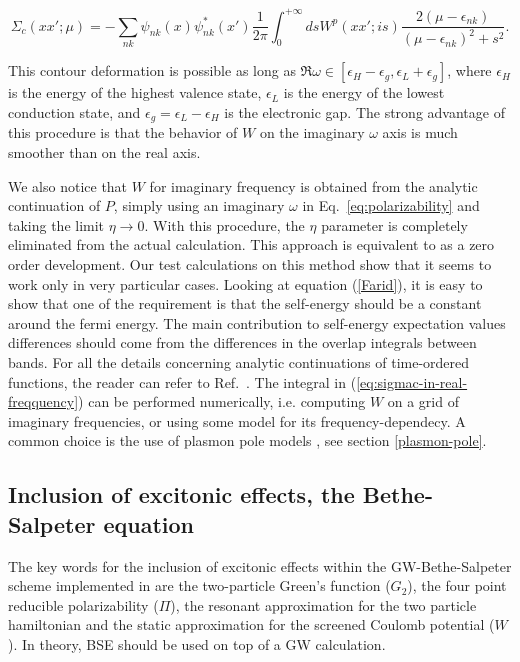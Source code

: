 \documentclass[11pt]{article}
\begin{document}
\begin{equation} \label{Farid}
\Sigma_c(xx';\mu) = -\sum_{nk} \psi_{nk}(x)\psi^*_{nk}(x')
\frac{1}{2\pi} \int_0^{+\infty}  ds W^p(xx';is)
\frac{2(\mu-\epsilon_{nk})}{(\mu-\epsilon_{nk})^2 + s^2}.
\end{equation}

This contour deformation is possible as long as
$\Re\omega\in[\epsilon_H-\epsilon_g,\epsilon_L+\epsilon_g]$,
where $\epsilon_H$ is the energy of the highest valence state,
$\epsilon_L$ is the energy of the lowest conduction state,
and $\epsilon_g=\epsilon_L-\epsilon_H$ is the electronic gap.
The strong advantage of this procedure is that the behavior
of $W$ on the imaginary $\omega$ axis is much smoother than on
the real axis.
 
We also notice that $W$ for imaginary frequency is obtained
from the analytic continuation of $P$,
simply using an imaginary $\omega$ in Eq.~\ref{eq:polarizability}
and taking the limit $\eta \rightarrow 0$.
With this procedure, the $\eta$ parameter is completely eliminated
from the actual calculation. This approach is equivalent to \cite{fari+88prb} as a zero order development.
Our test calculations on this method
show that it seems to work only in very particular cases. 
Looking at equation (\ref{Farid}), it
is easy to show that one of the requirement is that the self-energy should be a constant around the fermi energy.
The main contribution to self-energy expectation values differences should come 
from the differences in the overlap integrals between bands.
For all the details concerning
analytic continuations of time-ordered functions,
the reader can refer to Ref.~\cite{fari99book}.
The integral in (\ref{eq:sigmac-in-real-freqquency}) can be performed numerically,
i.e. computing $W$ on a grid of imaginary frequencies, or using some model
for its frequency-dependecy. A common choice is the use of plasmon pole models \cite{enge-fari93prb,godb-need89prl,hybe-loui86prb}, see section \ref{plasmon-pole}.

\subsection{Inclusion of excitonic effects, the Bethe-Salpeter equation}

The key words for the inclusion of excitonic effects within the GW-Bethe-Salpeter scheme implemented in \SAX are 
the two-particle Green's function ($G_2$), the four point reducible polarizability ($\Pi$), 
the resonant approximation for the two particle hamiltonian and the static approximation for 
the screened Coulomb potential ($W$). In theory, BSE should be used on top of a GW calculation.
\end{document}

